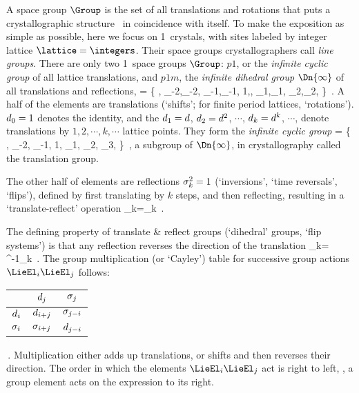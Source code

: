 A space group $\Group$ is the set of all translations and rotations that
puts a crystallographic structure \lattice\ in coincidence with itself.
To make the exposition as simple as possible, here we focus on 1\dmn\
crystals, with sites labeled by integer lattice $ \lattice=\integers$.
Their space groups crystallographers\rf{Dresselhaus07} call \emph{line
groups}.
%
There are only two 
{1\dmn\ space groups}  $\Group$: $p1$, or the \emph{infinite cyclic
group}  \Cn{\infty} of all lattice translations,
and
$p1m$, the \emph{infinite dihedral group} $\Dn{\infty}$  of all
translations and reflections,
\beq
  \Dn{\infty} = \{
\cdots, \shift_{-2},\Refl_{-2}, \shift_{-1},\Refl_{-1},
        1,\Refl,
        \shift_{1},\Refl_{1}, \shift_{2},\Refl_{2}, \cdots
             \}
\,.
A half of the elements are translations (`shifts'; for finite period
lattices, `rotations').
$d_{0}=1$ denotes the identity,
and
the
$d_{1}=d$, $d_{2}=d^2$, $\cdots$,
$d_{k}=d^k$, $\cdots$,
denote translations by $1,2,\cdots,k,\cdots$ lattice points. They form
the \emph{infinite cyclic group}
\beq
\Cn{\infty}
    =       \{
\cdots, \shift_{-2}, \shift_{-1},
        1,
        \shift_{1}, \shift_{2}, \shift_{3}, \cdots
             \}
\,,
\label{C_infty}
\eeq
a subgroup of $\Dn{\infty}$,
in crystallography called the translation group.

The other half of elements are reflections $\sigma_{k}^2=1$
(`inversions', `time reversals', `flips'), defined by first translating
by $k$ steps, and then reflecting, resulting in a `translate-reflect'
operation
\beq
\Refl_{k}=\Refl\shift_k
\,.

The defining property of translate \& reflect groups
(`dihedral' groups, `flip systems') is that
any reflection reverses the direction of the translation
\beq
\Refl_{k}\shift = \shift^{-1}\Refl_{k}
\,.
%
The group multiplication (or `Cayley') table for successive group actions
$\LieEl_i\LieEl_j$ follows:
\beq
\begin{tabular}{c|cc}
            &$d_j$        &$\sigma_j$\\\hline
$d_i$  &$d_{i+j}$     &$\sigma_{j-i}$\\
$\sigma_i$   &$\sigma_{i+j}$     &$d_{j-i}$
\end{tabular}
\,.
Multiplication either adds up translations,
or shifts and then reverses their direction.
The order in which the elements $\LieEl_i\LieEl_j$ act is right to left,
\ie, a group element acts on the expression to its right.

